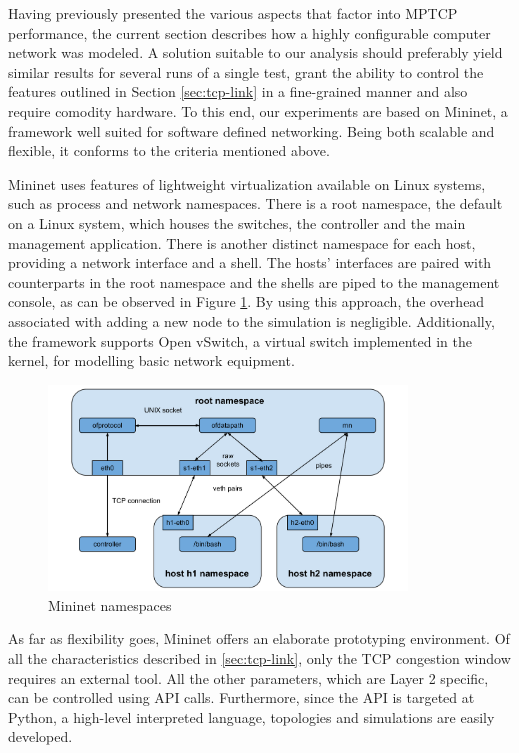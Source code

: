
Having previously presented the various aspects that factor into MPTCP
performance, the current section describes how a highly configurable computer
network was modeled. A solution suitable to our analysis should preferably
yield similar results for several runs of a single test, grant the ability to
control the features outlined in Section \ref{sec:tcp-link} in a fine-grained manner
and also require comodity hardware. To this end, our experiments are based on
Mininet, a framework well suited for software defined networking. Being both
scalable and flexible, it conforms to the criteria mentioned above.

Mininet uses features of lightweight virtualization available on Linux
systems, such as process and network namespaces\cite{mininet}. There is a root
namespace, the default on a Linux system, which houses the switches, the
controller and the main management application. There is another distinct
namespace for each host, providing a network interface and a shell. The hosts'
interfaces are paired with counterparts in the root namespace and the shells
are piped to the management console, as can be observed in Figure
\ref{fig:mininet-design}. By using this approach, the overhead associated with
adding a new node to the simulation is negligible. Additionally, the framework
supports Open vSwitch, a virtual switch implemented in the kernel, for
modelling basic network equipment.

\begin{figure}
  \centering
  \includegraphics[width=0.85\textwidth]{img/mininet-design}
  \caption{Mininet namespaces}
  \label{fig:mininet-design}
\end{figure}

As far as flexibility goes, Mininet offers an elaborate prototyping
environment. Of all the characteristics described in \ref{sec:tcp-link},
only the TCP congestion window requires an external tool. All the other
parameters, which are Layer 2 specific, can be controlled using API calls.
Furthermore, since the API is targeted at Python, a high-level interpreted
language, topologies and simulations are easily developed.

